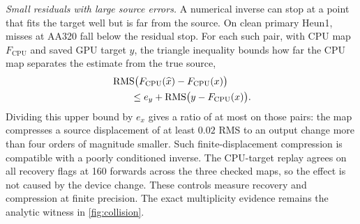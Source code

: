 \emph{Small residuals with large source errors.} A numerical inverse can stop at a point that fits the target well but is far from the source. On clean primary Heun1, \PrimaryHeunOneLowResidual{} misses at AA320 fall below the residual stop. For each such pair, with CPU map $F_{\mathrm{CPU}}$ and saved GPU target $y$, the triangle inequality bounds how far the CPU map separates the estimate from the true source,
\begin{equation}
 \begin{aligned}
 &\operatorname{RMS}\bigl(F_{\mathrm{CPU}}(\widehat x)-F_{\mathrm{CPU}}(x)\bigr)\\
 &\qquad\le e_y+\operatorname{RMS}\bigl(y-F_{\mathrm{CPU}}(x)\bigr).
 \end{aligned}
 \label{eq:secant}
\end{equation}
Dividing this upper bound by $e_x$ gives a ratio of at most \PrimarySecantUpper{} on those pairs: the map compresses a source displacement of at least $0.02$ RMS to an output change more than four orders of magnitude smaller. Such finite-displacement compression is compatible with a poorly conditioned inverse. The CPU-target replay agrees on all \PrecisionFlags{} recovery flags at 160 forwards across the three checked maps, so the effect is not caused by the device change. These controls measure recovery and compression at finite precision. The exact multiplicity evidence remains the analytic witness in \cref{fig:collision}.

